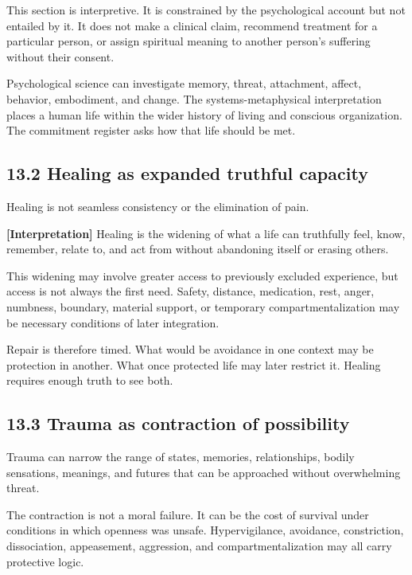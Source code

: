 \documentclass[
  11pt,
]{article}
\begin{document}
This section is interpretive. It is constrained by the psychological
account but not entailed by it. It does not make a clinical claim,
recommend treatment for a particular person, or assign spiritual meaning
to another person's suffering without their consent.

Psychological science can investigate memory, threat, attachment,
affect, behavior, embodiment, and change. The systems-metaphysical
interpretation places a human life within the wider history of living
and conscious organization. The commitment register asks how that life
should be met.

\subsection{13.2 Healing as expanded truthful
capacity}\label{healing-as-expanded-truthful-capacity}

Healing is not seamless consistency or the elimination of pain.

\textbf{{[}Interpretation{]}} Healing is the widening of what a life can
truthfully feel, know, remember, relate to, and act from without
abandoning itself or erasing others.

This widening may involve greater access to previously excluded
experience, but access is not always the first need. Safety, distance,
medication, rest, anger, numbness, boundary, material support, or
temporary compartmentalization may be necessary conditions of later
integration.

Repair is therefore timed. What would be avoidance in one context may be
protection in another. What once protected life may later restrict it.
Healing requires enough truth to see both.

\subsection{13.3 Trauma as contraction of
possibility}\label{trauma-as-contraction-of-possibility}

Trauma can narrow the range of states, memories, relationships, bodily
sensations, meanings, and futures that can be approached without
overwhelming threat.

The contraction is not a moral failure. It can be the cost of survival
under conditions in which openness was unsafe. Hypervigilance,
avoidance, constriction, dissociation, appeasement, aggression, and
compartmentalization may all carry protective logic.
\end{document}
